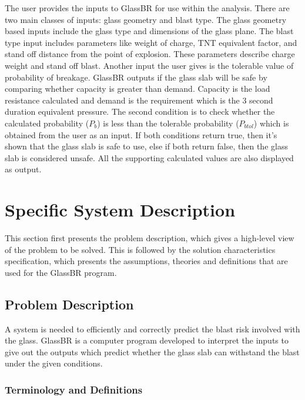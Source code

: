 \documentclass[12pt]{article}
\newcommand{\progname}{GlassBR}
\begin{document}
The user provides the inputs to \progname{} for use within the analysis. There are
two main classes of inputs: glass geometry and blast type. The glass geometry
based inputs include the glass type and dimensions of the glass plane. The blast
type input includes parameters like weight of charge, TNT equivalent factor, and
stand off distance from the point of explosion. These parameters describe charge
weight and stand off blast. Another input the user gives is the tolerable value
of probability of breakage. \progname{} outputs if the glass slab will be safe by
comparing whether capacity is greater than demand. Capacity is the load
resistance calculated and demand is the requirement which is the 3 second
duration equivalent pressure. The second condition is to check whether the
calculated probability (${P_{b}}$) is less than the tolerable probability
(${P_{btol}}$) which is obtained from the user as an input. If both conditions
return true, then it's shown that the glass slab is safe to use, else if both
return false, then the glass slab is considered unsafe. All the supporting
calculated values are also displayed as output.

\section{Specific System Description}

This section first presents the problem description, which gives a high-level
view of the problem to be solved.  This is followed by the solution
characteristics specification, which presents the assumptions, theories and
definitions that are used for the \progname{} program.

\subsection{Problem Description}\label{sec_probdesc}

A system is needed to efficiently and correctly predict the blast risk involved
with the glass. \progname{} is a computer program developed to interpret the
inputs to give out the outputs which predict whether the glass slab can
withstand the blast under the given conditions.


\subsubsection{Terminology and  Definitions}
\end{document}
